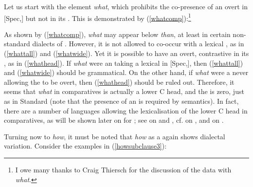 Let us start with the element \textit{what}, which prohibits the co-presence of an overt  in [Spec,] but not in its . This is demonstrated by (\ref{whatcomp}):\footnote{I owe many thanks to Craig Thiersch for the discussion of the data with \textit{what}.}

\ea \label{whatcomp}
 \label{whattall}
 \label{whatwide}
 \label{whathead}
\z
\z

As shown by (\ref{whatcomp}), \textit{what} may appear below \textit{than}, at least in certain non-standard dialects of . However, it is not allowed to co-occur with a lexical , as in (\ref{whattall}) and (\ref{whatwide}). Yet it is possible to have an overt, contrastive  in its , as in (\ref{whathead}). If \textit{what} were an  taking a lexical  in [Spec,], then (\ref{whattall}) and (\ref{whatwide}) should be grammatical. On the other hand, if \textit{what} were a   never allowing the  to be overt, then (\ref{whathead}) should be ruled out. Therefore, it seems that \textit{what} in comparatives is actually a lower C head, and the  is zero, just as in Standard  (note that the presence of an  is required by  semantics). In fact, there are a number of languages allowing the lexicalisation of the lower C head in comparatives, as will be shown later on for ; see \citet{bacskaiatkari2014dia} on  and , cf. \citet{jaeger2010} on , and \citet{bacskaiatkari2016alh} on .

Turning now to \textit{how}, it must be noted that \textit{how} as a  again shows dialectal variation. Consider the examples in (\ref{howsubclause3}):

\ea \label{howsubclause3}
 \label{howtallgrammatical}
 \label{howstrandedtall}
 \label{hownoap}
 \label{howwidegrammatical}
 \label{howstrandedwide}
\z
\z

